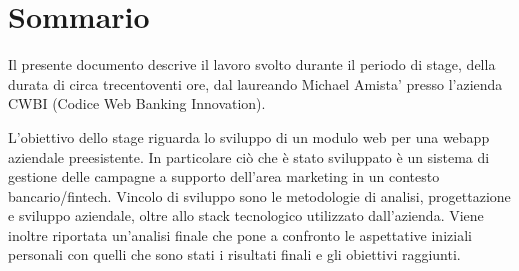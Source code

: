 \cleardoublepage
{}
{}
\begingroup
\let\clearpage\relax
\let\cleardoublepage\relax
\let\cleardoublepage\relax

\chapter*{Sommario}
Il presente documento descrive il lavoro svolto durante il periodo di stage, della durata di circa trecentoventi ore, dal laureando Michael Amista' presso l'azienda CWBI (Codice Web Banking Innovation).

\setlength{\parskip}{3ex}

\noindent L'obiettivo dello stage riguarda lo sviluppo di un modulo web per una webapp aziendale preesistente. In particolare ciò che è stato sviluppato è un sistema di gestione delle campagne a supporto dell'area marketing in un contesto bancario/fintech. Vincolo di sviluppo sono le metodologie di analisi, progettazione e sviluppo aziendale, oltre allo stack tecnologico utilizzato dall'azienda. Viene inoltre riportata un'analisi finale che pone a confronto le aspettative iniziali personali con quelli che sono stati i risultati finali e gli obiettivi raggiunti.

\endgroup

\vfill

